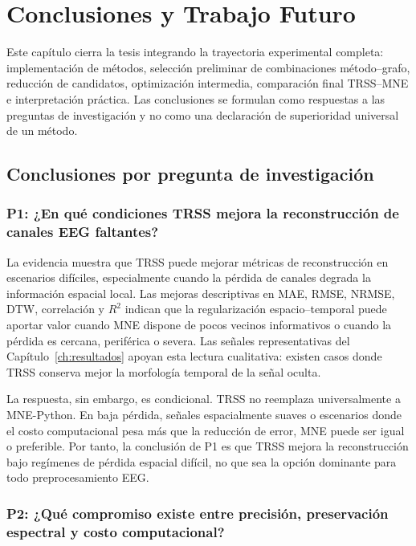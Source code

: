 \chapter{Conclusiones y Trabajo Futuro}
\label{ch:conclusiones}

Este capítulo cierra la tesis integrando la trayectoria experimental completa: implementación de métodos, selección preliminar de combinaciones método--grafo, reducción de candidatos, optimización intermedia, comparación final TRSS--MNE e interpretación práctica. Las conclusiones se formulan como respuestas a las preguntas de investigación y no como una declaración de superioridad universal de un método.

\section{Conclusiones por pregunta de investigación}

\subsection*{P1: ¿En qué condiciones TRSS mejora la reconstrucción de canales EEG faltantes?}

La evidencia muestra que TRSS puede mejorar métricas de reconstrucción en escenarios difíciles, especialmente cuando la pérdida de canales degrada la información espacial local. Las mejoras descriptivas en MAE, RMSE, NRMSE, DTW, correlación y $R^2$ indican que la regularización espacio--temporal puede aportar valor cuando MNE dispone de pocos vecinos informativos o cuando la pérdida es cercana, periférica o severa. Las señales representativas del Capítulo~\ref{ch:resultados} apoyan esta lectura cualitativa: existen casos donde TRSS conserva mejor la morfología temporal de la señal oculta.

La respuesta, sin embargo, es condicional. TRSS no reemplaza universalmente a MNE-Python. En baja pérdida, señales espacialmente suaves o escenarios donde el costo computacional pesa más que la reducción de error, MNE puede ser igual o preferible. Por tanto, la conclusión de P1 es que TRSS mejora la reconstrucción bajo regímenes de pérdida espacial difícil, no que sea la opción dominante para todo preprocesamiento EEG.

\subsection*{P2: ¿Qué compromiso existe entre precisión, preservación espectral y costo computacional?}


